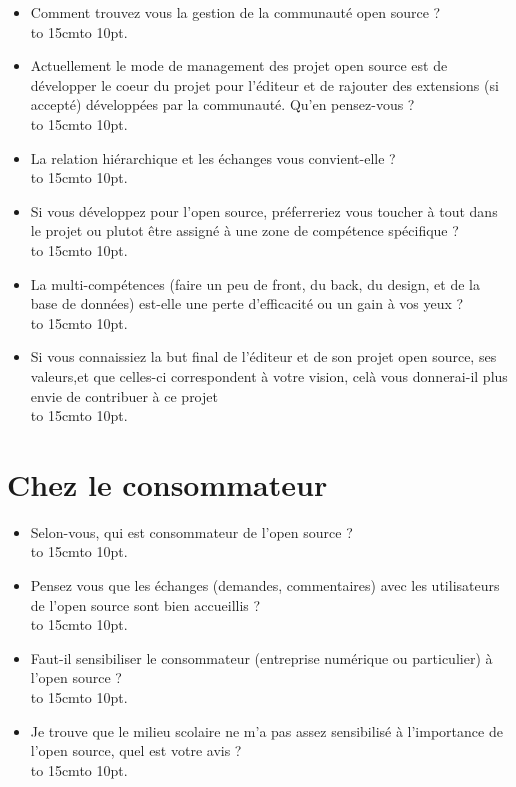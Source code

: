 \begin{appendices}
\begin{itemize}[label=\textbullet, font=\LARGE \color{burntorange}]
	\item Comment trouvez vous la gestion de la communauté open source ?\\
	\hbox to 15cm{\leaders\hbox to 10pt{\hss . \hss}\hfil}
	\item Actuellement le mode de management des projet open source est de développer le coeur du projet pour l'éditeur et de rajouter des extensions (si accepté) développées par la communauté. Qu'en pensez-vous ?\\
	\hbox to 15cm{\leaders\hbox to 10pt{\hss . \hss}\hfil}
	\item La relation hiérarchique et les échanges vous convient-elle ?\\
	\hbox to 15cm{\leaders\hbox to 10pt{\hss . \hss}\hfil}
	\item Si vous développez pour l'open source, préferreriez vous toucher à tout dans le projet ou plutot être assigné à une zone de compétence spécifique ?\\
	\hbox to 15cm{\leaders\hbox to 10pt{\hss . \hss}\hfil}
	\item La multi-compétences (faire un peu de front, du back, du design, et de la base de données) est-elle une perte d'efficacité ou un gain à vos yeux ?\\
	\hbox to 15cm{\leaders\hbox to 10pt{\hss . \hss}\hfil}
	\item Si vous connaissiez la but final de l'éditeur et de son projet open source, ses valeurs,et que celles-ci correspondent à votre vision, celà vous donnerai-il plus envie de contribuer à ce projet\\
	\hbox to 15cm{\leaders\hbox to 10pt{\hss . \hss}\hfil}
\end{itemize}

\newpage
\section{Chez le consommateur}

\begin{itemize}[label=\textbullet, font=\LARGE \color{burntorange}]
	\item Selon-vous, qui est consommateur de l'open source ?\\
	\hbox to 15cm{\leaders\hbox to 10pt{\hss . \hss}\hfil}
	\item Pensez vous que les échanges (demandes, commentaires) avec les utilisateurs de l'open source sont bien accueillis ?\\
	\hbox to 15cm{\leaders\hbox to 10pt{\hss . \hss}\hfil}
	\item Faut-il sensibiliser le consommateur (entreprise numérique ou particulier) à l'open source ?\\
	\hbox to 15cm{\leaders\hbox to 10pt{\hss . \hss}\hfil}
	\item Je trouve que le milieu scolaire ne m'a pas assez sensibilisé à l'importance de l'open source, quel est votre avis ?\\
	\hbox to 15cm{\leaders\hbox to 10pt{\hss . \hss}\hfil}
\end{itemize}


\end{appendices}

